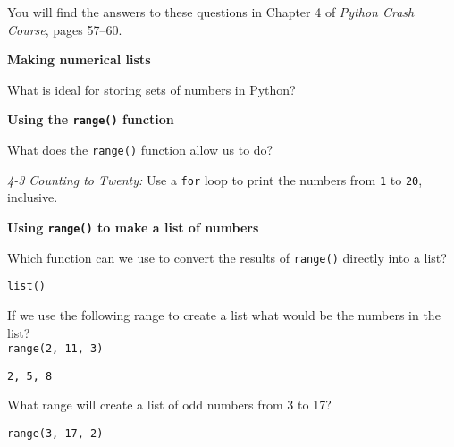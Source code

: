 \documentclass[a4paper,addpoints]{exam}
\begin{document}
\vspace{20pt}
\begin{center}
    You will find the answers to these questions in Chapter 4 of \textit{Python Crash Course}, pages 57--60.
\end{center}
\vspace{20pt}
\textbf{Making numerical lists}
\begin{questions}
    \question What is ideal for storing sets of numbers in Python?
    \begin{solutionorlines}[\stretch{1}]
    \end{solutionorlines}

    \vspace{15pt}
    \textbf{Using the \texttt{range()} function}

    \question What does the \texttt{range()} function allow us to do?
    \begin{solutionorlines}[\stretch{1}]
    \end{solutionorlines}

    \question \textit{4-3 Counting to Twenty:} Use a \texttt{for} loop to print the numbers from \texttt{1} to \texttt{20}, inclusive.
    \begin{solutionorlines}[\stretch{1}]
    \end{solutionorlines}

    \vspace{15pt}
    \textbf{Using \texttt{range()} to make a list of numbers}

    \question Which function can we use to convert the results of \texttt{range()} directly into a list?
    \begin{solutionorlines}[1cm]
        \texttt{list()}
    \end{solutionorlines}

    \question If we use the following range to create a list what would be the numbers in the list? \\
    \texttt{range(2, 11, 3)}
    \begin{solutionorlines}[1cm]
        \texttt{2, 5, 8}
    \end{solutionorlines}
    
    \question What range will create a list of odd numbers from 3 to 17?
    \begin{solutionorlines}[1cm]
        \texttt{range(3, 17, 2)}
    \end{solutionorlines}
    \clearpage


\end{questions}
\end{document}
